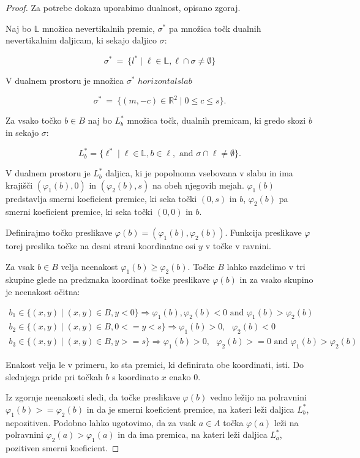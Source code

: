 \documentclass[a4paper, 12pt]{book}
\newcommand{\LL}{\ensuremath{\mathbb L}}
\newcommand{\RR}{\ensuremath{\mathbb R}}  %
\begin{document}
\begin{proof}
Za potrebe dokaza uporabimo dualnost, opisano zgoraj.

Naj bo $\LL$ množica nevertikalnih premic, $\sigma^*$ pa množica točk dualnih nevertikalnim daljicam, ki sekajo daljico $\sigma$:

\[
		\sigma^* ~=~ \{ l^* \mid \ell\in \LL, \ell\cap \sigma\neq \emptyset\} 
\]

V dualnem prostoru je množica $\sigma^*$ $horizontal slab$

\[
		\sigma^* ~=~ \{ (m,-c)\in \RR^2\mid 0\le c\le s\}.
\]

Za vsako točko $b\in B$ naj bo $L^* _b$ množica točk, dualnih premicam, ki gredo skozi $b$ in sekajo $\sigma$:

\[
		L^*_b=\{ \ell^* \mid \ell\in \LL, b \in \ell, \text{ and } \sigma\cap \ell\not= \emptyset\}.
	\]

V dualnem prostoru je $L^* _b$ daljica, ki je popolnoma vsebovana v slabu in ima krajišči $(\varphi_1(b),0)$ in $(\varphi_2(b),s)$ na obeh njegovih mejah. $\varphi_1(b)$ predstavlja smerni koeficient premice, ki seka točki $(0,s)$ in $b$, $\varphi_2(b)$ pa smerni koeficient premice, ki seka točki $(0,0)$ in $b$.

Definirajmo točko preslikave $\varphi(b)=(\varphi_1(b),\varphi_2(b))$. Funkcija preslikave $\varphi$ torej preslika točke na desni strani koordinatne osi $y$ v točke v ravnini.

Za vsak $b\in B$ velja neenakost $\varphi_1(b) \geq \varphi_2(b)$. Točke $B$ lahko razdelimo v tri skupine glede na predznaka koordinat točke preslikave $\varphi(b)$ in za vsako skupino je neenakost očitna:

\begin{align*}
    b_1 \in \{ (x,y) \mid (x,y) \in B, y < 0 \} \Rightarrow \varphi_1(b),\varphi_2(b) < 0 \text{ and } \varphi_1(b) > \varphi_2(b) \\
b_2 \in \{ (x,y) \mid (x,y) \in B, 0 <= y < s \} \Rightarrow \varphi_1(b) > 0, \text{ } \varphi_2(b) < 0 \\
    b_3 \in \{ (x,y) \mid (x,y) \in B, y >= s \} \Rightarrow \varphi_1(b) > 0, \text{ } \varphi_2(b) >= 0 \text{ and } \varphi_1(b) > \varphi_2(b)
\end{align*}

Enakost velja le v primeru, ko sta premici, ki definirata obe koordinati, isti. Do slednjega pride pri točkah $b$ s koordinato $x$ enako $0$. 

Iz zgornje neenakosti sledi, da točke preslikave $\varphi(b)$ vedno ležijo na polravnini $\varphi_1(b) >= \varphi_2(b)$ in da je smerni koeficient premice, na kateri leži daljica $L^*_b$, nepozitiven. Podobno lahko ugotovimo, da za vsak $a \in A$ točka $\varphi(a)$ leži na polravnini $\varphi_2(a) > \varphi_1(a)$ in da ima premica, na kateri leži daljica $L^*_a$, pozitiven smerni koeficient.


\end{proof}
\end{document}
